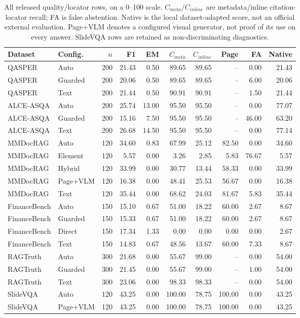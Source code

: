 \begin{table}[t]
\centering\small
\begin{tabular}{@{}llrrrrrrrr@{}}
\toprule
Dataset & Config. & $n$ & F1 & EM & $C_{meta}$ & $C_{inline}$ & Page & FA & Native \\
\midrule
QASPER & Auto & 200 & 21.43 & 0.50 & 89.65 & 89.65 & -- & 0.00 & 21.43 \\
QASPER & Guarded & 200 & 20.06 & 0.50 & 89.65 & 89.65 & -- & 6.00 & 20.06 \\
QASPER & Text & 200 & 21.44 & 0.50 & 90.91 & 90.91 & -- & 1.50 & 21.44 \\
\midrule
ALCE-ASQA & Auto & 200 & 25.74 & 13.00 & 95.50 & 95.50 & -- & 0.00 & 77.07 \\
ALCE-ASQA & Guarded & 200 & 15.16 & 7.50 & 95.50 & 95.50 & -- & 46.00 & 63.20 \\
ALCE-ASQA & Text & 200 & 26.68 & 14.50 & 95.50 & 95.50 & -- & 0.00 & 77.14 \\
\midrule
MMDocRAG & Auto & 120 & 34.60 & 0.83 & 67.99 & 25.12 & 82.50 & 0.00 & 34.60 \\
MMDocRAG & Element & 120 & 5.57 & 0.00 & 3.26 & 2.85 & 5.83 & 76.67 & 5.57 \\
MMDocRAG & Hybrid & 120 & 33.99 & 0.00 & 30.77 & 13.44 & 58.33 & 0.00 & 33.99 \\
MMDocRAG & Page+VLM & 120 & 16.38 & 0.00 & 48.41 & 25.53 & 56.67 & 0.00 & 16.38 \\
MMDocRAG & Text & 120 & 35.44 & 0.00 & 68.62 & 24.03 & 81.67 & 5.83 & 35.44 \\
\midrule
FinanceBench & Auto & 150 & 15.10 & 0.67 & 51.00 & 18.22 & 60.00 & 2.67 & 8.67 \\
FinanceBench & Guarded & 150 & 15.33 & 0.67 & 51.00 & 18.22 & 60.00 & 2.67 & 8.67 \\
FinanceBench & Direct & 150 & 17.34 & 1.33 & 0.00 & 0.00 & 0.00 & 0.00 & 2.67 \\
FinanceBench & Text & 150 & 14.83 & 0.67 & 48.56 & 13.67 & 60.00 & 7.33 & 8.67 \\
\midrule
RAGTruth & Auto & 300 & 21.68 & 0.00 & 55.67 & 99.00 & -- & 0.00 & 54.00 \\
RAGTruth & Guarded & 300 & 21.45 & 0.00 & 55.67 & 99.00 & -- & 1.00 & 54.00 \\
RAGTruth & Text & 300 & 23.06 & 0.00 & 98.33 & 98.33 & -- & 0.00 & 54.00 \\
\midrule
SlideVQA & Auto & 120 & 43.25 & 0.00 & 100.00 & 78.75 & 100.00 & 0.00 & 43.25 \\
SlideVQA & Page+VLM & 120 & 43.25 & 0.00 & 100.00 & 78.75 & 100.00 & 0.00 & 43.25 \\
\bottomrule
\end{tabular}
\caption{All released quality/locator rows, on a 0--100 scale. $C_{meta}$/$C_{inline}$ are metadata/inline citation-locator recall; FA is false abstention. Native is the local dataset-adapted score, not an official external evaluation. Page+VLM denotes a configured visual generator, not proof of its use on every answer. SlideVQA rows are retained as non-discriminating diagnostics.}
\label{tab:all-quality}
\end{table}

